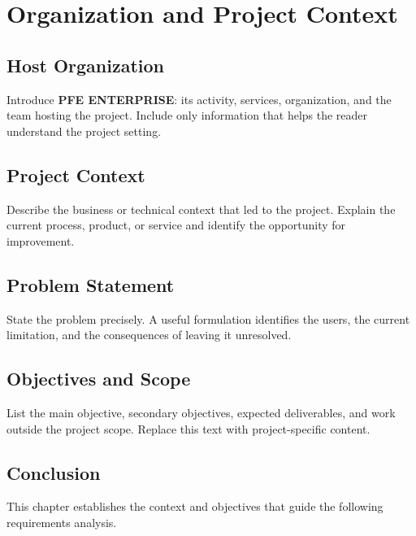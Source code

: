 \chapter{Organization and Project Context}
\label{chap:context}

\section{Host Organization}
Introduce \textbf{PFE ENTERPRISE}: its activity, services, organization, and the team hosting the project. Include only information that helps the reader understand the project setting.

\section{Project Context}
Describe the business or technical context that led to the project. Explain the current process, product, or service and identify the opportunity for improvement.

\section{Problem Statement}
State the problem precisely. A useful formulation identifies the users, the current limitation, and the consequences of leaving it unresolved.

\section{Objectives and Scope}
List the main objective, secondary objectives, expected deliverables, and work outside the project scope. Replace this text with project-specific content.

\section*{Conclusion}
This chapter establishes the context and objectives that guide the following requirements analysis.
